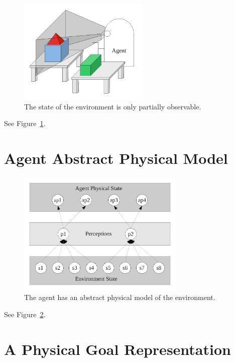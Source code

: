 \begin{figure}[bth]
  \center
  \includegraphics[height=5cm]{gfx/partial_frame_perception}
  \caption[The state of the environment is only partially
    observable.]{The state of the environment is only partially
    observable.}
  \label{fig:partial_frame_perception}
\end{figure}

See Figure~\ref{fig:partial_frame_perception}.


\section{Agent Abstract Physical Model}

\begin{figure}[bth]
  \center
  \includegraphics[width=8cm]{gfx/environment_perception_physical}
  \caption[The agent has an abstract physical model of the
    environment.]{The agent has an abstract physical model of the
    environment.}
  \label{fig:environment_perception_physical}
\end{figure}

See Figure~\ref{fig:environment_perception_physical}.


\section{A Physical Goal Representation}

